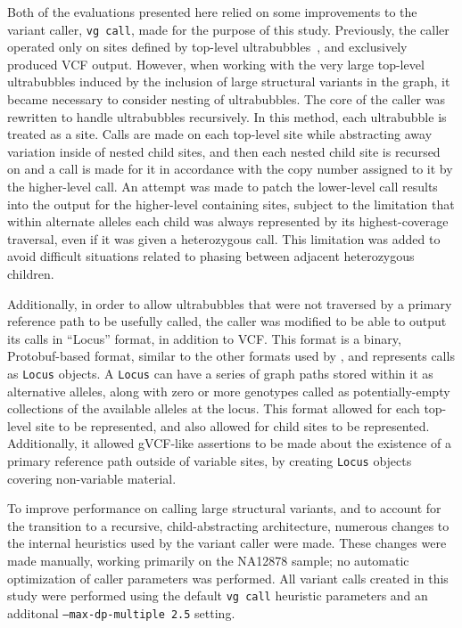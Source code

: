 Both of the evaluations presented here relied on some improvements to the \vg variant caller, \texttt{vg call}, made for the purpose of this study. Previously, the caller operated only on sites defined by top-level ultrabubbles~\cite{paten2017superbubbles}, and exclusively produced VCF output. However, when working with the very large top-level ultrabubbles induced by the inclusion of large structural variants in the graph, it became necessary to consider nesting of ultrabubbles. The core of the caller was rewritten to handle ultrabubbles recursively. In this method, each ultrabubble is treated as a site. Calls are made on each top-level site while abstracting away variation inside of nested child sites, and then each nested child site is recursed on and a call is made for it in accordance with the copy number assigned to it by the higher-level call. An attempt was made to patch the lower-level call results into the output for the higher-level containing sites, subject to the limitation that within alternate alleles each child was always represented by its highest-coverage traversal, even if it was given a heterozygous call. This limitation was added to avoid difficult situations related to phasing between adjacent heterozygous children.

Additionally, in order to allow ultrabubbles that were not traversed by a primary reference path to be usefully called, the caller was modified to be able to output its calls in ``Locus'' format, in addition to VCF. This format is a binary, Protobuf-based format, similar to the other formats used by \vg, and represents calls as \texttt{Locus} objects. A \texttt{Locus} can have a series of graph paths stored within it as alternative alleles, along with zero or more genotypes called as potentially-empty collections of the available alleles at the locus. This format allowed for each top-level site to be represented, and also allowed for child sites to be represented. Additionally, it allowed gVCF-like assertions to be made about the existence of a primary reference path outside of variable sites, by creating \texttt{Locus} objects covering non-variable material.

To improve performance on calling large structural variants, and to account for the transition to a recursive, child-abstracting architecture, numerous changes to the internal heuristics used by the variant caller were made. These changes were made manually, working primarily on the NA12878 sample; no automatic optimization of caller parameters was performed. All variant calls created in this study were performed using the default \texttt{vg call} heuristic parameters and an additonal \texttt{--max-dp-multiple 2.5} setting.

